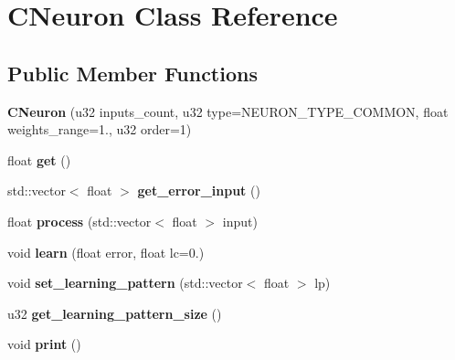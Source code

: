 \hypertarget{classCNeuron}{\section{C\-Neuron Class Reference}
\label{classCNeuron}
}
\subsection*{Public Member Functions}
\begin{DoxyCompactItemize}
\item 
\hypertarget{classCNeuron_ae9f32d41d2bb7b9683a440e038f5b6f6}{{\bfseries C\-Neuron} (u32 inputs\-\_\-count, u32 type=N\-E\-U\-R\-O\-N\-\_\-\-T\-Y\-P\-E\-\_\-\-C\-O\-M\-M\-O\-N, float weights\-\_\-range=1., u32 order=1)}\label{classCNeuron_ae9f32d41d2bb7b9683a440e038f5b6f6}

\item 
\hypertarget{classCNeuron_af97048090878729c7d99dcb8363e61ff}{float {\bfseries get} ()}\label{classCNeuron_af97048090878729c7d99dcb8363e61ff}

\item 
\hypertarget{classCNeuron_a5f5933df84bbc696da10a6d4951b28a7}{std\-::vector$<$ float $>$ {\bfseries get\-\_\-error\-\_\-input} ()}\label{classCNeuron_a5f5933df84bbc696da10a6d4951b28a7}

\item 
\hypertarget{classCNeuron_a0b9c5ff02de4dae0f2bc98d81810d597}{float {\bfseries process} (std\-::vector$<$ float $>$ input)}\label{classCNeuron_a0b9c5ff02de4dae0f2bc98d81810d597}

\item 
\hypertarget{classCNeuron_a64eb412ce09f2f59077281d86a085303}{void {\bfseries learn} (float error, float lc=0.)}\label{classCNeuron_a64eb412ce09f2f59077281d86a085303}

\item 
\hypertarget{classCNeuron_a0bcb7781406fa9a282eaafe4b154b5b6}{void {\bfseries set\-\_\-learning\-\_\-pattern} (std\-::vector$<$ float $>$ lp)}\label{classCNeuron_a0bcb7781406fa9a282eaafe4b154b5b6}

\item 
\hypertarget{classCNeuron_ad3cfde2fc3314e525345e8ec6595b1cb}{u32 {\bfseries get\-\_\-learning\-\_\-pattern\-\_\-size} ()}\label{classCNeuron_ad3cfde2fc3314e525345e8ec6595b1cb}

\item 
\hypertarget{classCNeuron_a37db8b58d3d3cd00c2cdc12b0a7466b3}{void {\bfseries print} ()}\label{classCNeuron_a37db8b58d3d3cd00c2cdc12b0a7466b3}


\end{DoxyCompactItemize}
